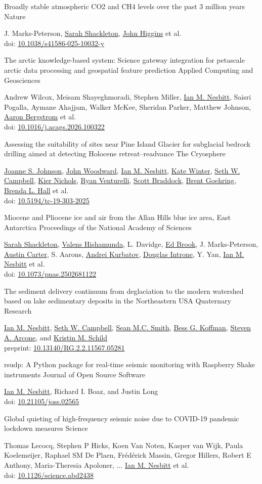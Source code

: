 \documentclass[a4paper,12pt,sans,colorlinks]{moderncv}
\newcommand{\me}{\href{https://www.iannesbitt.org}{Ian M. Nesbitt}}
\newcommand{\seth}{\href{https://www.alpinesciences.net}{Seth W. Campbell}}
\newcommand{\sean}{\href{https://umaine.edu/earthclimate/people/sean-m-c-smith/}{Sean M.C. Smith}}
\newcommand{\bess}{\href{https://www.colby.edu/directory/profile/bess.koffman/}{Bess G. Koffman}}
\newcommand{\stevearcone}{\href{https://engineering.dartmouth.edu/community/faculty/steven-arcone}{Steven A. Arcone}}
\newcommand{\kristin}{\href{https://climatechange.umaine.edu/people/kristin-schild/}{Kristin M. Schild}}
\newcommand{\richard}{Richard I. Boaz}
\newcommand{\johnwoodward}{\href{https://www.northumbria.ac.uk/about-us/our-staff/w/john-woodward}{John Woodward}}
\newcommand{\joannejohnson}{\href{https://www.bas.ac.uk/profile/jsj/}{Joanne S. Johnson}}
\newcommand{\brenda}{\href{https://climatechange.umaine.edu/people/brenda-hall/}{Brenda L. Hall}}
\newcommand{\scott}{\href{https://climatechange.umaine.edu/people/scott-braddock/}{Scott Braddock}}
\newcommand{\brent}{\href{https://sse.tulane.edu/eens/faculty/goehring}{Brent Goehring}}
\newcommand{\ryanventurelli}{\href{https://sse.tulane.edu/eens/faculty/venturelli}{Ryan Venturelli}}
\newcommand{\kiernichols}{\href{https://www.researchgate.net/profile/Keir-Nichols}{Kier Nichols}}
\newcommand{\katewinter}{\href{https://www.northumbria.ac.uk/about-us/our-staff/w/kate-winter}{Kate Winter}}
\newcommand{\sarahshackleton}{\href{https://www.whoi.edu/profile/sarah.shackleton/}{Sarah Shackleton}}
\newcommand{\johnhiggins}{\href{https://geosciences.princeton.edu/people/john-higgins}{John Higgins}}
\newcommand{\austincarter}{\href{https://carboncycle.princeton.edu/people/austin-j-carter}{Austin Carter}}
\newcommand{\valenshishamunda}{\href{https://orcid.org/0000-0003-1043-6847}{Valens Hishamunda}}
\newcommand{\edbrook}{\href{https://ceoas.oregonstate.edu/directory/ed-brook}{Ed Brook}}
\newcommand{\ldavidge}{L. Davidge}
\newcommand{\jmarkspeterson}{J. Marks-Peterson}
\newcommand{\saarons}{S. Aarons}
\newcommand{\andreikurbatov}{\href{https://orcid.org/0000-0002-9819-9251}{Andrei Kurbatov}}
\newcommand{\dougintrone}{\href{https://orcid.org/0000-0002-3632-3704}{Douglas Introne}}
\newcommand{\yyan}{Y. Yan}
\newcommand{\meisamshayeghmoradi}{Meisam Shayeghmoradi}
\newcommand{\andrewwilcox}{Andrew Wilcox}
\newcommand{\sheridanparker}{Sheridan Parker}
\newcommand{\aaronbergstrom}{\href{https://orcid.org/0000-0002-0025-1737}{Aaron Bergstrom}}
\newcommand{\stephenmiller}{Stephen Miller}
\newcommand{\saisripogalla}{Saisri Pogalla}
\newcommand{\aymaneahajjam}{Aymane Ahajjam}
\newcommand{\walkermckee}{Walker McKee}
\newcommand{\matthewjohnson}{Matthew Johnson}
\newcommand{\doi}[1]{%
    \href{https://doi.org/#1}{#1}
}
\begin{document}
{Broadly stable atmospheric CO2 and CH4 levels over the past 3 million years}
{Nature}
{}
{}
{
    \jmarkspeterson{}, \sarahshackleton{}, \johnhiggins{} et al.
    \\
    doi: \doi{10.1038/s41586-025-10032-y}
}

{The arctic knowledge-based system: Science gateway integration for petascale arctic data processing and geospatial feature prediction}
{Applied Computing and Geosciences}
{}
{}
{
    \andrewwilcox{}, \meisamshayeghmoradi{}, \stephenmiller{}, \me{}, \saisripogalla{},
    \aymaneahajjam{}, \walkermckee{}, \sheridanparker{}, \matthewjohnson{}, \aaronbergstrom{} et al.
    \\
    doi: \doi{10.1016/j.acags.2026.100322}
}

{Assessing the suitability of sites near Pine Island Glacier for subglacial bedrock drilling aimed at detecting Holocene retreat–readvance}
{The Cryosphere}
{}
{}
{
    \joannejohnson{}, \johnwoodward{}, \me{}, \katewinter{}, \seth{},
    \kiernichols{}, \ryanventurelli{}, \scott{}, \brent{}, \brenda{} et al.
    \\
    doi: \doi{10.5194/tc-19-303-2025}
}

{Miocene and Pliocene ice and air from the Allan Hills blue ice area, East Antarctica}
{Proceedings of the National Academy of Sciences}
{}
{}
{
    \sarahshackleton{}, \valenshishamunda{}, \ldavidge{}, \edbrook{}, \jmarkspeterson{}, \austincarter{},
    \saarons{}, \andreikurbatov{}, \dougintrone{}, \yyan{}, \me{} et al.
    \\
    doi: \doi{10.1073/pnas.2502681122}
}

{The sediment delivery continuum from deglaciation to the modern
watershed based on lake sedimentary deposits in the Northeastern
USA}
{Quaternary Research}
{}
{}
{
    \me{}, \seth{}, \sean{}, \bess{}, \stevearcone{},
    and \kristin{}
    \\
    preprint: \doi{10.13140/RG.2.2.11567.05281}
}

{rsudp: A Python package for real-time seismic
monitoring with Raspberry Shake instruments}
{Journal of Open Source Software}
{}
{}
{
    \me{}, \richard, and Justin Long
    \\
    doi: \doi{10.21105/joss.02565}
}

{Global quieting of high-frequency seismic noise
due to COVID-19 pandemic lockdown measures}
{Science}
{}
{}
{
    Thomas Lecocq, Stephen P Hicks, Koen Van Noten,
    Kasper van Wijk, Paula Koelemeijer, Raphael SM De Plaen,
    Frédérick Massin, Gregor Hillers, Robert E Anthony,
    Maria-Theresia Apoloner, ... \me{} et al.
    \\
    doi: \doi{10.1126/science.abd2438}
}
\end{document}
